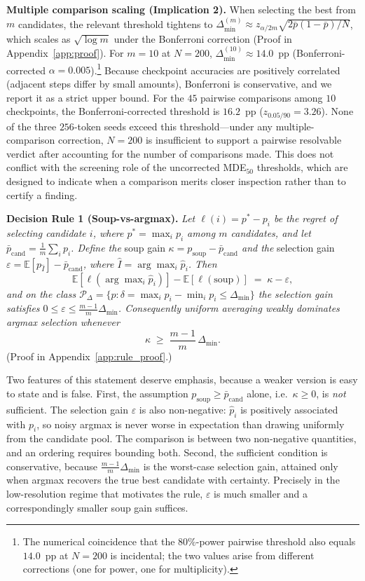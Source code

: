 \documentclass[pdflatex,sn-mathphys-ay,iicol]{sn-jnl}
\theoremstyle{thmstylethree}
\begin{document}
\noindent\textbf{Multiple comparison scaling (Implication 2).} When selecting the best from $m$ candidates, the relevant threshold tightens to $\Delta_{\min}^{(m)} \approx z_{\alpha/2m}\sqrt{2\bar{p}(1-\bar{p})/N}$, which scales as $\sqrt{\log m}$ under the Bonferroni correction (Proof in Appendix~\ref{app:proof}). For $m=10$ at $N=200$, $\Delta_{\min}^{(10)}\approx 14.0$~pp (Bonferroni-corrected $\alpha=0.005$).\footnote{The numerical coincidence that the $80\%$-power pairwise threshold also equals $14.0$~pp at $N=200$ is incidental; the two values arise from different corrections (one for power, one for multiplicity).} Because checkpoint accuracies are positively correlated (adjacent steps differ by small amounts), Bonferroni is conservative, and we report it as a strict upper bound. For the $45$ pairwise comparisons among $10$ checkpoints, the Bonferroni-corrected threshold is $16.2$~pp ($z_{0.05/90}=3.26$). None of the three $256$-token seeds exceed this threshold---under any multiple-comparison correction, $N=200$ is insufficient to support a pairwise resolvable verdict after accounting for the number of comparisons made. This does not conflict with the screening role of the uncorrected MDE$_{50}$ thresholds, which are designed to indicate when a comparison merits closer inspection rather than to certify a finding.

\textbf{Decision Rule 1 (Soup-vs-argmax).} \emph{Let $\ell(i) = p^* - p_i$ be the regret of selecting candidate $i$, where $p^* = \max_i p_i$ among $m$ candidates, and let $\bar p_{\mathrm{cand}} = \frac{1}{m}\sum_i p_i$. Define the} soup gain \emph{$\kappa = p_{\mathrm{soup}} - \bar p_{\mathrm{cand}}$ and the} selection gain \emph{$\varepsilon = \mathbb{E}[p_{\hat I}] - \bar p_{\mathrm{cand}}$, where $\hat I = \arg\max_i \hat p_i$. Then}
\[
\mathbb{E}[\ell(\arg\max\nolimits_i \hat p_i)] - \mathbb{E}[\ell(\mathrm{soup})] \;=\; \kappa - \varepsilon ,
\]
\emph{and on the class $\mathcal{P}_\Delta = \{p : \delta = \max_i p_i - \min_i p_i \leq \Delta_{\min}\}$ the selection gain satisfies $0 \leq \varepsilon \leq \frac{m-1}{m}\Delta_{\min}$. Consequently uniform averaging weakly dominates argmax selection whenever}
\[
\kappa \;\geq\; \frac{m-1}{m}\,\Delta_{\min}.
\]
\noindent (Proof in Appendix~\ref{app:rule_proof}.)

Two features of this statement deserve emphasis, because a weaker version is easy to state and is false. First, the assumption $p_{\mathrm{soup}} \geq \bar p_{\mathrm{cand}}$ alone, i.e.\ $\kappa \geq 0$, is \emph{not} sufficient. The selection gain $\varepsilon$ is also non-negative: $\hat p_i$ is positively associated with $p_i$, so noisy argmax is never worse in expectation than drawing uniformly from the candidate pool. The comparison is between two non-negative quantities, and an ordering requires bounding both. Second, the sufficient condition is conservative, because $\frac{m-1}{m}\Delta_{\min}$ is the worst-case selection gain, attained only when argmax recovers the true best candidate with certainty. Precisely in the low-resolution regime that motivates the rule, $\varepsilon$ is much smaller and a correspondingly smaller soup gain suffices.
\end{document}
